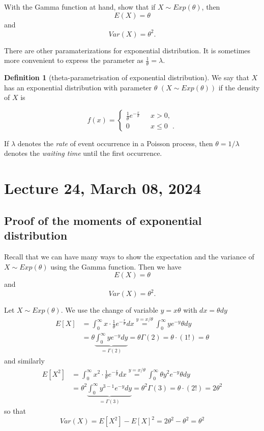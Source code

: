 \documentclass[
]{book}
\theoremstyle{definition}
\newtheorem{definition}{Definition}[chapter]
\theoremstyle{definition}
\theoremstyle{definition}
\theoremstyle{definition}
\theoremstyle{remark}
\begin{document}
With the Gamma function at hand, show that if \(X\sim Exp(\theta)\), then
\[ E(X)=\theta\]
and
\[Var(X)=\theta^2.\]

There are other paramaterizations for exponential distribution.
It is sometimes more convenient to express the parameter as \(\frac{1}{\theta}=\lambda\).

\begin{definition}[theta-parametrisation of exponential distribution]
We say that \(X\) has an exponential distribution with parameter \(\theta\) \((X\sim Exp(\theta))\) if the density of \(X\) is

\[ f(x) =\begin{cases}
      \frac{1}{\theta} e ^{- \frac{x}{\theta}} & \mbox{ $x >0$,} \\
      0 & \mbox{ $x \le 0$ }.
   \end{cases}
\]
\end{definition}

If \(\lambda\) denotes the \emph{rate} of event occurrence in a Poisson process, then \(\theta = 1/\lambda\) denotes the \emph{waiting time} until the first occurrence.

\chapter{Lecture 24, March 08, 2024}\label{lecture-24-march-08-2024}

\newcommand{\var}{\mathbb{V}ar}
\newcommand{\R}{\mathbb{R}}
\newcommand{\E}{\mathbb{E}}

\section{Proof of the moments of exponential distribution}\label{proof-of-the-moments-of-exponential-distribution}

Recall that we can have many ways to show the expectation and the variance of \(X\sim Exp(\theta)\) using the Gamma function. Then we have
\[ E(X)=\theta\]
and
\[Var(X)=\theta^2.\]

Let \(X\sim Exp(\theta)\). We use the change of variable \(y=x\theta\) with \(dx =\theta dy\)
\begin{align*}
        E[X]&= \int_0^\infty x \cdot \frac{1}{\theta} e^{-\frac{x}{\theta}}dx \overset{y=x/\theta}{=}  \int_0^\infty y e^{-y} \theta dy\\
        &= \theta \underbrace{\int_0^\infty y e^{-y}   dy}_{=\Gamma(2)}= \theta \Gamma(2) = \theta \cdot (1!) =\theta 
    \end{align*}
and similarly
\begin{align*}
        E[X^2]&= \int_0^\infty x^2 \cdot \frac{1}{\theta} e^{-\frac{x}{\theta}}dx\overset{y=x/\theta}{=}  \int_0^\infty \theta y^2 e^{-y} \theta dy\\
        &= \theta^2 \underbrace{\int_0^\infty y^{3-1} e^{-y}   dy}_{=\Gamma(3)}= \theta^2 \Gamma(3) = \theta \cdot (2!) =2\theta^2 
    \end{align*}
so that
\[ Var(X) = E[X^2]-E[X]^2=2\theta^2-\theta^2 =\theta^2\]
\end{document}
